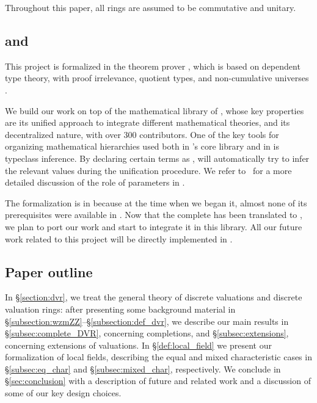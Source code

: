 \documentclass[sigplan,10pt, nonacm, review]{acmart}
\begin{document}
Throughout this paper, all rings are assumed to be commutative and unitary.

\subsection{\texorpdfstring{\lean[\empty] and \mathlib}{Lean and mathlib}}
This project is formalized in the \lean theorem prover \cite{Lean3}, which is based on dependent type theory, with proof irrelevance, quotient types, and non-cumulative universes \cite{TypeTheory}.

We build our work on top of the mathematical library \mathlib of \lean{\empty}, whose key properties are its unified approach to integrate different mathematical theories, and its decentralized nature, with over 300 contributors. One of the key tools for organizing mathematical hierarchies used both in \lean[\empty]'s core library and in \mathlib is typeclass inference. By declaring certain terms as , \lean[\empty] will automatically try to infer the relevant values during the unification procedure. We refer to~\cite{Baa22} for a more detailed discussion of the role of  parameters in \lean[\empty].

The formalization is in \lean because at the time when we began it, almost none of its prerequisites were available in \lean[4]. Now that the complete \mathlib has been translated to \lean[4], we plan to port our work and start to integrate it in this library. All our future work related to this project will be directly implemented in \lean[4].

\subsection{Paper outline}
In \S\ref{section:dvr}, we treat the general theory of discrete valuations and discrete valuation rings: after presenting some background material in \S\ref{subsection:wzmZZ}--\S\ref{subsection:def_dvr}, we describe our main results in \S\ref{subsec:complete_DVR}, concerning completions, and \S\ref{subsec:extensions}, concerning extensions of valuations. In \S\ref{def:local_field} we present our formalization of local fields, describing the equal and mixed characteristic cases in \S\ref{subsec:eq_char} and \S\ref{subsec:mixed_char}, respectively. We conclude in \S\ref{sec:conclusion} with a description of future and related work and a discussion of some of our key design choices.
\end{document}
